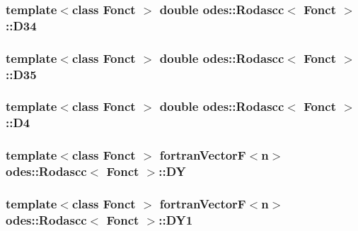 \hypertarget{classodes_1_1Rodascc_a6cb390c2b0e8c27fded5b66ab65f7951}{
\subsubsection[{D34}]{\setlength{\rightskip}{0pt plus 5cm}template$<$class Fonct $>$ double {\bf odes\-::\-Rodascc}$<$ Fonct $>$\-::D34\hspace{0.3cm}{\ttfamily [private]}}}\label{classodes_1_1Rodascc_a6cb390c2b0e8c27fded5b66ab65f7951}
\hypertarget{classodes_1_1Rodascc_a3195cd9391a99b88dbf6dd983b9afcbb}{
\subsubsection[{D35}]{\setlength{\rightskip}{0pt plus 5cm}template$<$class Fonct $>$ double {\bf odes\-::\-Rodascc}$<$ Fonct $>$\-::D35\hspace{0.3cm}{\ttfamily [private]}}}\label{classodes_1_1Rodascc_a3195cd9391a99b88dbf6dd983b9afcbb}
\hypertarget{classodes_1_1Rodascc_ae07324454cb563cbb84ccf266e2cbd7a}{
\subsubsection[{D4}]{\setlength{\rightskip}{0pt plus 5cm}template$<$class Fonct $>$ double {\bf odes\-::\-Rodascc}$<$ Fonct $>$\-::D4\hspace{0.3cm}{\ttfamily [private]}}}\label{classodes_1_1Rodascc_ae07324454cb563cbb84ccf266e2cbd7a}
\hypertarget{classodes_1_1Rodascc_af9ba770adeaa348e546d74683f91013a}{
\subsubsection[{D\-Y}]{\setlength{\rightskip}{0pt plus 5cm}template$<$class Fonct $>$ {\bf fortran\-Vector\-F}$<${\bf n}$>$ {\bf odes\-::\-Rodascc}$<$ Fonct $>$\-::D\-Y\hspace{0.3cm}{\ttfamily [private]}}}\label{classodes_1_1Rodascc_af9ba770adeaa348e546d74683f91013a}
\hypertarget{classodes_1_1Rodascc_ae61f474cc8c95916b606e84817cdfee7}{
\subsubsection[{D\-Y1}]{\setlength{\rightskip}{0pt plus 5cm}template$<$class Fonct $>$ {\bf fortran\-Vector\-F}$<${\bf n}$>$ {\bf odes\-::\-Rodascc}$<$ Fonct $>$\-::D\-Y1\hspace{0.3cm}{\ttfamily [private]}}}\label{classodes_1_1Rodascc_ae61f474cc8c95916b606e84817cdfee7}
